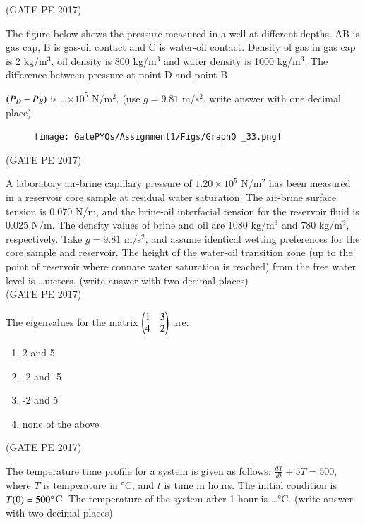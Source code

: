 \documentclass[journal,12pt,onecolumn]{IEEEtran}
\theoremstyle{remark}
\begin{document}
\begin{enumerate}
\hfill{(GATE PE 2017)}

\item The figure below shows the pressure measured in a well at different depths. AB is gas cap, B is gas-oil contact and C is water-oil contact. Density of gas in gas cap is 2 kg/m$^3$, oil density is 800 kg/m$^3$ and water density is 1000 kg/m$^3$.
The difference between pressure at point D and point B {$\left(P_D - P_B\right)$ is \dots $\times 10^5$ N/m$^2$. (use $g = 9.81$ m/s$^2$, write answer with one decimal place)\\
\begin{figure}[h]
    \centering
    \texttt{[image: GatePYQs/Assignment1/Figs/GraphQ \_33.png]}
\end{figure}
\hfill{(GATE PE 2017)}

\item A laboratory air-brine capillary pressure of $1.20 \times 10^5$ N/m$^2$ has been measured in a reservoir core sample at residual water saturation. The air-brine surface tension is 0.070 N/m, and the brine-oil interfacial tension for the reservoir fluid is 0.025 N/m. The density values of brine and oil are 1080 kg/m$^3$ and 780 kg/m$^3$, respectively.
Take $g = 9.81$ m/s$^2$, and assume identical wetting preferences for the core sample and reservoir. The height of the water-oil transition zone (up to the point of reservoir where connate water saturation is reached) from the free water level is \dots meters. (write answer with two decimal places)\\

\hfill{(GATE PE 2017)}

\item The eigenvalues for the matrix $ \begin{pmatrix}
1 & 3 \\
4 & 2 
\end{pmatrix}$ are:
\begin{enumerate}
\item 2 and 5
\item -2 and -5
\item -2 and 5
\item none of the above
\end{enumerate}
\hfill{(GATE PE 2017)}

\item The temperature time profile for a system is given as follows:
$ \frac{dT}{dt} + 5T = 500,$ where $T$ is temperature in °C, and $t$ is time in hours. The initial condition is $T(0) = 500\degree$C.
The temperature of the system after 1 hour is \dots °C. (write answer with two decimal places)\\

}
\end{enumerate}
\end{document}
